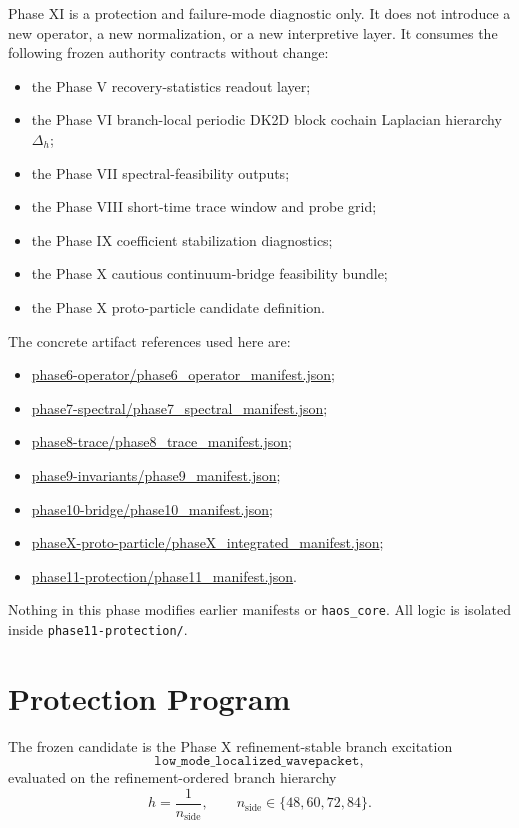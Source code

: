 \documentclass[11pt]{article}
\begin{document}
Phase XI is a protection and failure-mode diagnostic only. It does not introduce a new operator, a new normalization, or a new interpretive layer. It consumes the following frozen authority contracts without change:
\begin{itemize}
\item the Phase V recovery-statistics readout layer;
\item the Phase VI branch-local periodic DK2D block cochain Laplacian hierarchy $\Delta_h$;
\item the Phase VII spectral-feasibility outputs;
\item the Phase VIII short-time trace window and probe grid;
\item the Phase IX coefficient stabilization diagnostics;
\item the Phase X cautious continuum-bridge feasibility bundle;
\item the Phase X proto-particle candidate definition.
\end{itemize}

The concrete artifact references used here are:
\begin{itemize}
\item \url{phase6-operator/phase6_operator_manifest.json};
\item \url{phase7-spectral/phase7_spectral_manifest.json};
\item \url{phase8-trace/phase8_trace_manifest.json};
\item \url{phase9-invariants/phase9_manifest.json};
\item \url{phase10-bridge/phase10_manifest.json};
\item \url{phaseX-proto-particle/phaseX_integrated_manifest.json};
\item \url{phase11-protection/phase11_manifest.json}.
\end{itemize}

Nothing in this phase modifies earlier manifests or \texttt{haos\_core}. All logic is isolated inside \texttt{phase11-protection/}.

\section{Protection Program}

The frozen candidate is the Phase X refinement-stable branch excitation
\[
\texttt{low\_mode\_localized\_wavepacket},
\]
evaluated on the refinement-ordered branch hierarchy
\[
h = \frac{1}{n_{\mathrm{side}}}, \qquad
n_{\mathrm{side}} \in \{48,60,72,84\}.
\]
\end{document}
